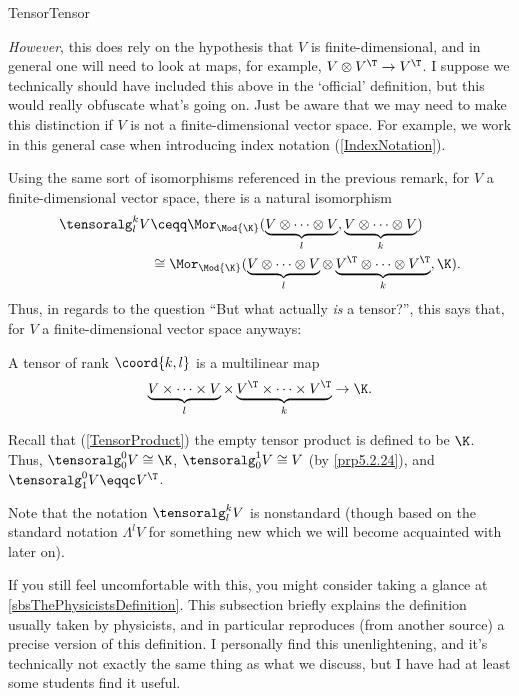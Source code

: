 \begin{dfn}{Tensor}{Tensor}
\begin{rmk}
		\emph{However}, this does rely on the hypothesis that $V$ is finite-dimensional, and in general one will need to look at maps, for example, $V\otimes V^{\T}\rightarrow V^{\T}$.  I suppose we technically should have included this above in the `official' definition, but this would really obfuscate what's going on.  Just be aware that we may need to make this distinction if $V$ is not a finite-dimensional vector space.  For example, we work in this general case when introducing index notation (\cref{IndexNotation}).
	\end{rmk}
	\begin{rmk}
		Using the same sort of isomorphisms referenced in the previous remark, for $V$ a finite-dimensional vector space, there is a natural isomorphism
		\begin{equation}
			\begin{split}
				\tensoralg _l^kV & \ceqq \Mor _{\Mod{\K}}(\underbrace{V\otimes \cdots \otimes V}_l,\underbrace{V\otimes \cdots \otimes V}_k) \\
				& \cong \Mor _{\Mod{\K}}(\underbrace{V\otimes \cdots \otimes V}_l\otimes \underbrace{V^{\T}\otimes \cdots \otimes V^{\T}}_k,\K ).
			\end{split}
		\end{equation}
		Thus, in regards to the question ``But what actually \emph{is} a tensor?'', this says that, for $V$ a finite-dimensional vector space anyways:
		\begin{important}
			A tensor of rank $\coord{k,l}$ is a multilinear map
			\begin{equation}\label{eqn5.4.6}
				\underbrace{V\times \cdots \times V}_l\times \underbrace{V^{\T}\times \cdots \times V^{\T}}_k\rightarrow \K .
			\end{equation}
		\end{important}
	\end{rmk}
	\begin{rmk}
		Recall that (\cref{TensorProduct}) the empty tensor product is defined to be $\K$.  Thus, $\tensoralg _0^0V\cong \K$, $\tensoralg _0^1V\cong V$ (by \cref{prp5.2.24}), and $\tensoralg _1^0V\eqqc V^{\T}$.
	\end{rmk}
	\begin{rmk}
		Note that the notation $\tensoralg _l^kV$ is nonstandard (though based on the standard notation $\Lambda ^lV$ for something new which we will become acquainted with later on).
	\end{rmk}
	\begin{rmk}
		If you still feel uncomfortable with this, you might consider taking a glance at \cref{sbsThePhysicistsDefinition}.  This subsection briefly explains the definition usually taken by physicists, and in particular reproduces (from another source) a precise version of this definition.  I personally find this unenlightening, and it's technically not exactly the same thing as what we discuss, but I have had at least some students find it useful.
	\end{rmk}
\end{dfn}
